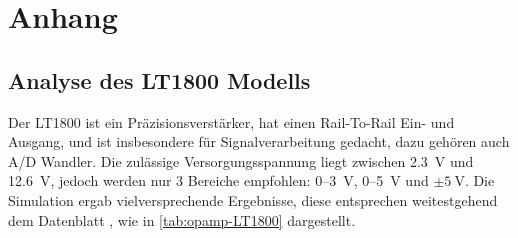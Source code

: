 \documentclass[
	ngerman,
	parskip=half,
	twocolumn,
	DIV=calc,
	]{scrartcl}
\begin{document}
	\section{Anhang}
	
	\subsection{Analyse des LT1800 Modells}
	\label{sec:appendix_LT1800_analysis}
	Der LT1800 ist ein Präzisionsverstärker, hat einen Rail-To-Rail Ein- und Ausgang, und ist insbesondere für Signalverarbeitung gedacht, dazu gehören auch A/D Wandler. Die zulässige Versorgungsspannung liegt zwischen \SI{2.3}{\volt} und \SI{12.6}{\volt}, jedoch werden nur 3 Bereiche empfohlen: 0--\SI{3}{\volt}, 0--\SI{5}{\volt}  und $\pm\SI{5}{\volt} $. Die Simulation ergab vielversprechende Ergebnisse, diese entsprechen weitestgehend dem Datenblatt \cite{datasheet:LT1800}, wie in \cref{tab:opamp-LT1800}  dargestellt.
	
\end{document}
